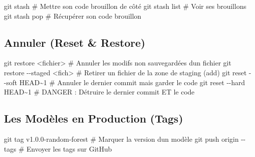 \documentclass[
  letterpaper,
  DIV=11,
  numbers=noendperiod]{scrreprt}
\newenvironment{Shaded}{\begin{snugshade}}{\end{snugshade}}
\newcommand{\AlertTok}[1]{\textcolor[rgb]{0.68,0.00,0.00}{#1}}
\newcommand{\AttributeTok}[1]{\textcolor[rgb]{0.40,0.45,0.13}{#1}}
\newcommand{\CommentTok}[1]{\textcolor[rgb]{0.37,0.37,0.37}{#1}}
\newcommand{\FunctionTok}[1]{\textcolor[rgb]{0.28,0.35,0.67}{#1}}
\newcommand{\NormalTok}[1]{\textcolor[rgb]{0.00,0.23,0.31}{#1}}
\newcommand{\OperatorTok}[1]{\textcolor[rgb]{0.37,0.37,0.37}{#1}}
\begin{document}
\begin{Shaded}
\begin{Highlighting}[]
\FunctionTok{git}\NormalTok{ stash       }\CommentTok{\# Mettre son code brouillon de côté}
\FunctionTok{git}\NormalTok{ stash list  }\CommentTok{\# Voir ses brouillons}
\FunctionTok{git}\NormalTok{ stash pop   }\CommentTok{\# Récupérer son code brouillon}
\end{Highlighting}
\end{Shaded}

\subsection{Annuler (Reset \& Restore)}\label{annuler-reset-restore}

\begin{Shaded}
\begin{Highlighting}[]
\FunctionTok{git}\NormalTok{ restore }\OperatorTok{\textless{}}\NormalTok{fichier}\OperatorTok{\textgreater{}}        \CommentTok{\# Annuler les modifs non sauvegardées d\textquotesingle{}un fichier}
\FunctionTok{git}\NormalTok{ restore }\AttributeTok{{-}{-}staged} \OperatorTok{\textless{}}\NormalTok{fich}\OperatorTok{\textgreater{}}  \CommentTok{\# Retirer un fichier de la zone de staging (add)}
\FunctionTok{git}\NormalTok{ reset }\AttributeTok{{-}{-}soft}\NormalTok{ HEAD\textasciitilde{}1      }\CommentTok{\# Annuler le dernier commit mais garder le code}
\FunctionTok{git}\NormalTok{ reset }\AttributeTok{{-}{-}hard}\NormalTok{ HEAD\textasciitilde{}1      }\CommentTok{\# }\AlertTok{DANGER}\CommentTok{ : Détruire le dernier commit ET le code}
\end{Highlighting}
\end{Shaded}

\subsection{Les Modèles en Production
(Tags)}\label{les-moduxe8les-en-production-tags}

\begin{Shaded}
\begin{Highlighting}[]
\FunctionTok{git}\NormalTok{ tag v1.0.0{-}random{-}forest }\CommentTok{\# Marquer la version d\textquotesingle{}un modèle}
\FunctionTok{git}\NormalTok{ push origin }\AttributeTok{{-}{-}tags}       \CommentTok{\# Envoyer les tags sur GitHub}
\end{Highlighting}
\end{Shaded}
\end{document}
